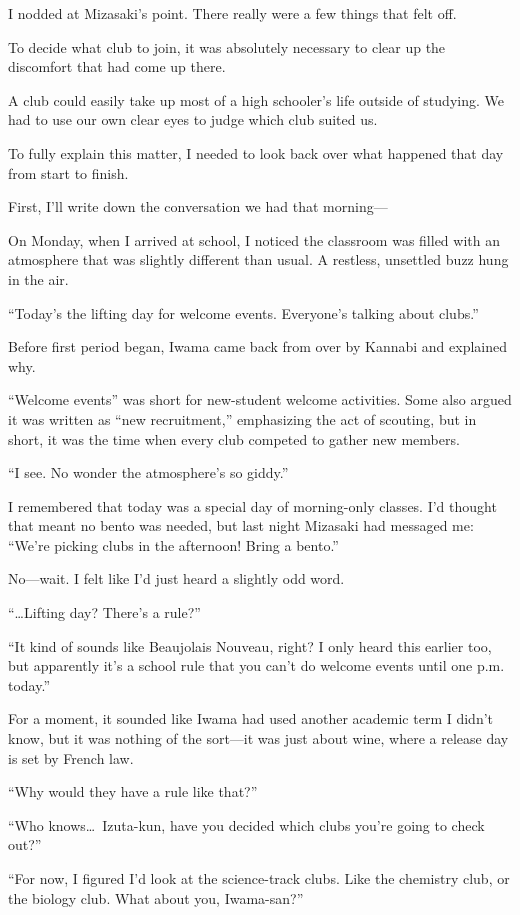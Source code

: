 \documentclass[
    a4paper,
    12pt,
    twoside,
    openany,
    UTF8,
    fontset=windows
]{ctexbook}
\begin{document}
I nodded at Mizasaki's point. There really were a few things that felt off.

To decide what club to join, it was absolutely necessary to clear up the discomfort that had come up there.

A club could easily take up most of a high schooler's life outside of studying. We had to use our own clear eyes to judge which club suited us.

To fully explain this matter, I needed to look back over what happened that day from start to finish.

First, I'll write down the conversation we had that morning---

On Monday, when I arrived at school, I noticed the classroom was filled with an atmosphere that was slightly different than usual. A restless, unsettled buzz hung in the air.

``Today's the lifting day for welcome events. Everyone's talking about clubs.''

Before first period began, Iwama came back from over by Kannabi and explained why.

``Welcome events'' was short for new-student welcome activities. Some also argued it was written as ``new recruitment,'' emphasizing the act of scouting, but in short, it was the time when every club competed to gather new members.

``I see. No wonder the atmosphere's so giddy.''

I remembered that today was a special day of morning-only classes. I'd thought that meant no bento was needed, but last night Mizasaki had messaged me: ``We're picking clubs in the afternoon! Bring a bento.''

No---wait. I felt like I'd just heard a slightly odd word.

``\dots Lifting day? There's a rule?''

``It kind of sounds like Beaujolais Nouveau, right? I only heard this earlier too, but apparently it's a school rule that you can't do welcome events until one p.m. today.''

For a moment, it sounded like Iwama had used another academic term I didn't know, but it was nothing of the sort---it was just about wine, where a release day is set by French law.

``Why would they have a rule like that?''

``Who knows\dots\ Izuta-kun, have you decided which clubs you're going to check out?''

``For now, I figured I'd look at the science-track clubs. Like the chemistry club, or the biology club. What about you, Iwama-san?''
\end{document}
